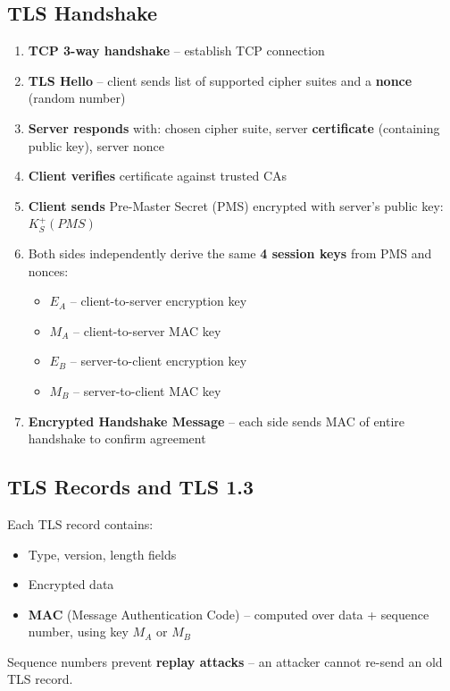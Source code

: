 \subsection{TLS Handshake}

\begin{tcolorbox}[keybox, title=TLS Handshake Steps]
\begin{enumerate}[noitemsep]
  \item \textbf{TCP 3-way handshake} -- establish TCP connection
  \item \textbf{TLS Hello} -- client sends list of supported cipher suites and a \textbf{nonce} (random number)
  \item \textbf{Server responds} with: chosen cipher suite, server \textbf{certificate} (containing public key), server nonce
  \item \textbf{Client verifies} certificate against trusted CAs
  \item \textbf{Client sends} Pre-Master Secret (PMS) encrypted with server's public key: $K_S^+(PMS)$
  \item Both sides independently derive the same \textbf{4 session keys} from PMS and nonces:
    \begin{itemize}[noitemsep]
      \item $E_A$ -- client-to-server encryption key
      \item $M_A$ -- client-to-server MAC key
      \item $E_B$ -- server-to-client encryption key
      \item $M_B$ -- server-to-client MAC key
    \end{itemize}
  \item \textbf{Encrypted Handshake Message} -- each side sends MAC of entire handshake to confirm agreement
\end{enumerate}
\end{tcolorbox}

\subsection{TLS Records and TLS 1.3}

\begin{tcolorbox}[keybox, title=TLS Records]
Each TLS record contains:
\begin{itemize}[noitemsep]
  \item Type, version, length fields
  \item Encrypted data
  \item \textbf{MAC} (Message Authentication Code) -- computed over data + sequence number, using key $M_A$ or $M_B$
\end{itemize}
Sequence numbers prevent \textbf{replay attacks} -- an attacker cannot re-send an old TLS record.
\end{tcolorbox}

